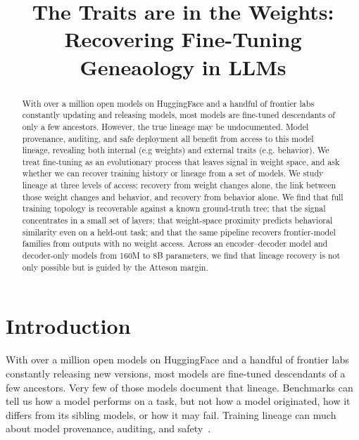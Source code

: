 \documentclass{article}
\title{The Traits are in the Weights: Recovering Fine-Tuning Geneaology in LLMs}
\theoremstyle{definition}
\theoremstyle{plain}
\begin{document}
\maketitle

\begin{abstract}
With over a million open models on HuggingFace and a handful of frontier labs constantly updating and releasing models, most models are fine-tuned descendants of only a few ancestors.  However, the true lineage may be undocumented. Model provenance, auditing, and safe deployment all benefit from access to this model lineage, revealing both internal (e.g weights) and external traits (e.g. behavior). We treat fine-tuning as an evolutionary process that leaves signal in weight space, and ask whether we can recover training history or lineage from a set of models. We study lineage at three levels of access: recovery from weight changes alone, the link between those weight changes and behavior, and recovery from behavior alone. We find that full training topology is recoverable against a known ground-truth tree; that the signal concentrates in a small set of layers; that weight-space proximity predicts behavioral similarity even on a held-out task; and that the same pipeline recovers frontier-model families from outputs with no weight access. Across an encoder--decoder model and decoder-only models from 160M to 8B parameters, we find that lineage recovery is not only  possible but is guided by the Atteson margin.

\end{abstract}

\section{Introduction}
\label{sec:intro}




With over a million open models on HuggingFace and a handful of frontier
labs constantly releasing new versions, most models are
fine-tuned descendants of a few ancestors.  Very few of those models document that lineage. Benchmarks can tell us how a model performs on a task, but not how a model originated, how it differs from its sibling models, or how it may
fail. Training lineage can  much about model provenance, auditing, and safety~\cite{behavioral2026provenance, nikolic2026model, tensorguard2025}.
\end{document}
